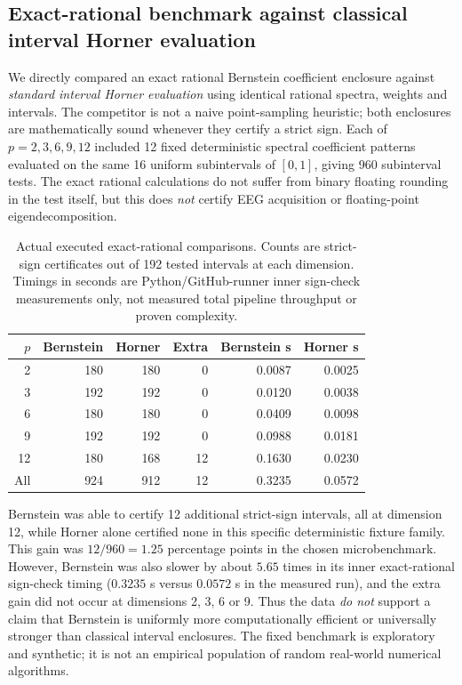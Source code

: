 \subsection{Exact-rational benchmark against classical interval Horner evaluation}
\label{sec:p4-exact-two-compare}
We directly compared an exact rational Bernstein
coefficient enclosure against \emph{standard interval
Horner evaluation} using identical rational spectra,
weights and intervals. The competitor is not a
naive point-sampling heuristic; both enclosures are
mathematically sound whenever they certify a strict
sign. Each of $p=2,3,6,9,12$ included
12 fixed deterministic spectral coefficient patterns
evaluated on the same 16 uniform subintervals of
$[0,1]$, giving 960 subinterval tests.
The exact rational calculations do not suffer
from binary floating rounding in the test itself,
but this does \emph{not} certify EEG acquisition or
floating-point eigendecomposition.

\begin{table}[tb]\centering\small
\caption{Actual executed exact-rational comparisons.
Counts are strict-sign certificates out of 192
tested intervals at each dimension. Timings in
seconds are Python/GitHub-runner inner sign-check
measurements only, not measured total pipeline
throughput or proven complexity.}
\label{tab:p4-horner-comparison}
\setlength{\tabcolsep}{4pt}
\begin{tabular}{rrrrrr}
\toprule
$p$ & Bernstein & Horner & Extra & Bernstein s & Horner s\\
\midrule
2  & 180 & 180 & 0 & 0.0087 & 0.0025\\
3  & 192 & 192 & 0 & 0.0120 & 0.0038\\
6  & 180 & 180 & 0 & 0.0409 & 0.0098\\
9  & 192 & 192 & 0 & 0.0988 & 0.0181\\
12 & 180 & 168 & 12 & 0.1630 & 0.0230\\
\midrule
All & 924 & 912 & 12 & 0.3235 & 0.0572\\
\bottomrule
\end{tabular}
\end{table}

Bernstein was able to certify 12 additional
strict-sign intervals, all at dimension 12,
while Horner alone certified none in this
specific deterministic fixture family.
This gain was $12/960=1.25$ percentage points
in the chosen microbenchmark. However, Bernstein
was also slower by about $5.65$ times in its
inner exact-rational sign-check timing
($0.3235$ s versus $0.0572$ s in the
measured run), and the extra gain did not occur
at dimensions 2, 3, 6 or 9.
Thus the data \emph{do not} support a claim
that Bernstein is uniformly more computationally
efficient or universally stronger than
classical interval enclosures. The fixed
benchmark is exploratory and synthetic;
it is not an empirical population of
random real-world numerical algorithms.

